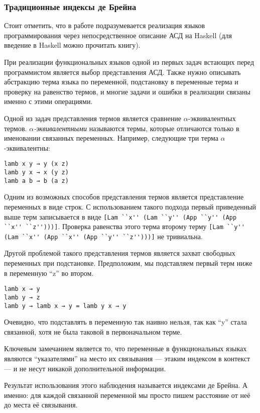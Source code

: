 \subsubsection{Традиционные индексы де Брейна}\label{de_brujin}
Стоит отметить, что в работе подразумевается реализация языков программирования через непосредственное описание АСД на Haskell (для введение в Haskell можно прочитать книгу\cite{moronuki}).

При реализации функциональных языков одной из первых задач встающих перед программистом является выбор представления АСД. Также нужно описывать абстракцию терма языка по переменной, подстановку в переменные терма и проверку на равенство термов, и многие задачи и ошибки в реализации связаны именно с этими операциями.

Одной из задач представления термов является сравнение $\alpha$-эквивалентных термов. \textit{$\alpha$-эквивалентными} называются термы, которые отличаются только в именовании связанных переменных. Например, следующие три терма $\alpha$-эквивалентны:

\begin{lstlisting}
lamb x y → y (x z)
lamb y x → x (y z)
lamb a b → b (a z)
\end{lstlisting}

Одним из возможных способов представления термов является представление переменных в виде строк. С использованием такого подхода первый приведенный выше терм записывается в виде \lstinline{[Lam ``x'' (Lam ``y'' (App ``y'' (App ``x'' ``z'')))]}. Проверка равенства этого терма второму терму \lstinline{[Lam ``y'' (Lam ``x'' (App ``x'' (App ``y'' ``z'')))]} не тривиальна.

Другой проблемой такого представления термов является захват свободных переменных при подстановке. Предположим, мы подставляем первый терм ниже в переменную ``z'' во втором.
\begin{lstlisting}
lamb x → y
lamb y → z
lamb y → lamb x → y = lamb y x → y
\end{lstlisting}

Очевидно, что подставлять в переменную так наивно нельзя, так как ``y'' стала связанной, хотя не была таковой в первоначальном терме.

Ключевым замечанием является то, что переменные в функциональных языках являются ``указателями'' на место их связывания --- этаким индексом в контекст --- и не несут никакой дополнительной информации.

Результат использования этого наблюдения называется индексами де Брейна. А именно: для каждой связанной переменной мы просто пишем расстояние от неё до места её связывания.

